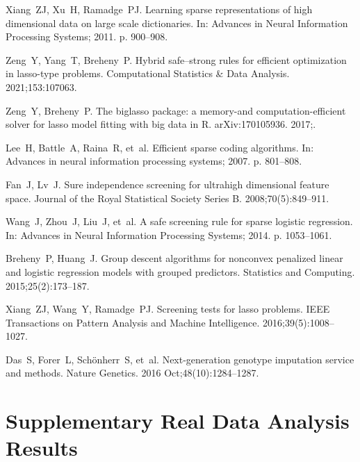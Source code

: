 \documentclass[]{interact}
\theoremstyle{plain}%
\theoremstyle{definition}
\theoremstyle{remark}
\begin{document}
\begin{thebibliography}{10}
Xiang~ZJ, Xu~H, Ramadge~PJ. Learning sparse representations of high dimensional
  data on large scale dictionaries. In: Advances in Neural Information
  Processing Systems; 2011. p. 900--908.

Zeng~Y, Yang~T, Breheny~P. Hybrid safe–strong rules for efficient
  optimization in lasso-type problems. Computational Statistics \& Data
  Analysis. 2021;\hspace{0pt}153:107063.

Zeng~Y, Breheny~P. The biglasso package: a memory-and computation-efficient
  solver for lasso model fitting with big data in {R}. arXiv:170105936.
  2017;\hspace{0pt}.

Lee~H, Battle~A, Raina~R, et~al. Efficient sparse coding algorithms. In:
  Advances in neural information processing systems; 2007. p. 801--808.

Fan~J, Lv~J. Sure independence screening for ultrahigh dimensional feature
  space. Journal of the Royal Statistical Society Series B.
  2008;\hspace{0pt}70(5):849--911.

Wang~J, Zhou~J, Liu~J, et~al. A safe screening rule for sparse logistic
  regression. In: Advances in Neural Information Processing Systems; 2014. p.
  1053--1061.

Breheny~P, Huang~J. Group descent algorithms for nonconvex penalized linear and
  logistic regression models with grouped predictors. Statistics and Computing.
  2015;\hspace{0pt}25(2):173--187.

Xiang~ZJ, Wang~Y, Ramadge~PJ. Screening tests for lasso problems. IEEE
  Transactions on Pattern Analysis and Machine Intelligence.
  2016;\hspace{0pt}39(5):1008--1027.

Das~S, Forer~L, Sch{\"o}nherr~S, et~al. Next-generation genotype imputation
  service and methods. Nature Genetics. 2016 Oct;\hspace{0pt}48(10):1284--1287.

\end{thebibliography}

\appendix
\appendixpage

\section{Supplementary Real Data Analysis Results}
\label{sec:ap}
\end{document}
